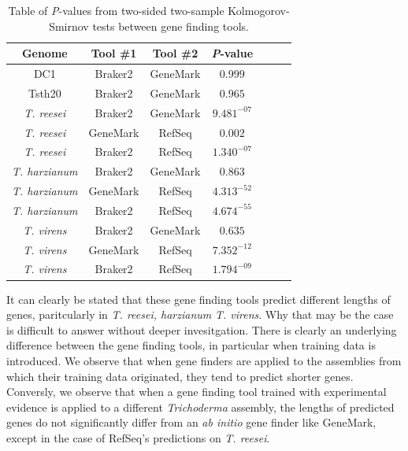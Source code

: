 \begin{table}
  \begin{center}
    \begin{tabular}{|c|c|c|c|c|c|c|}
      \hline
      Genome & Tool \#1 & Tool \#2 & \textit{P}-value  \\ \hline
      DC1 & Braker2 & GeneMark & $0.999$ \\ \hline
      Tsth20 & Braker2 & GeneMark & $0.965$ \\ \hline
      \textit{T. reesei} & Braker2 & GeneMark & $9.481^{-07}$ \\ \hline
      \textit{T. reesei} & GeneMark & RefSeq & $0.002$ \\ \hline
      \textit{T. reesei} & Braker2 & RefSeq & $1.340^{-07}$ \\ \hline
      \textit{T. harzianum} & Braker2 & GeneMark & $0.863$ \\ \hline
      \textit{T. harzianum} & GeneMark & RefSeq & $4.313^{-52}$ \\ \hline
      \textit{T. harzianum} & Braker2 & RefSeq & $4.674^{-55}$ \\ \hline
      \textit{T. virens} & Braker2 & GeneMark & $0.635$ \\ \hline
      \textit{T. virens} & GeneMark & RefSeq & $7.352^{-12}$ \\ \hline
      \textit{T. virens} & Braker2 & RefSeq & $1.794^{-09}$ \\ \hline
    \end{tabular}
  \end{center}
  \caption{Table of \textit{P}-values from two-sided two-sample
    Kolmogorov-Smirnov tests between gene finding tools.}
  \label{table:ks-2s}
\end{table}

It can clearly be stated that these gene finding tools predict
different lengths of genes, paritcularly in \textit{T. reesei,
  harzianum} \textit{T. virens}. Why that may be the case is difficult
to answer without deeper invesitgation. There is clearly an underlying
difference between the gene finding tools, in particular when training
data is introduced. We observe that when gene finders are applied to
the assemblies from which their training data originated, they tend to
predict shorter genes. Conversly, we observe that when a gene finding
tool trained with experimental evidence is applied to a different
\textit{Trichoderma} assembly, the lengths of predicted genes do not
significantly differ from an \textit{ab initio} gene finder like
GeneMark, except in the case of RefSeq's predictions on
\textit{T. reesei}.
